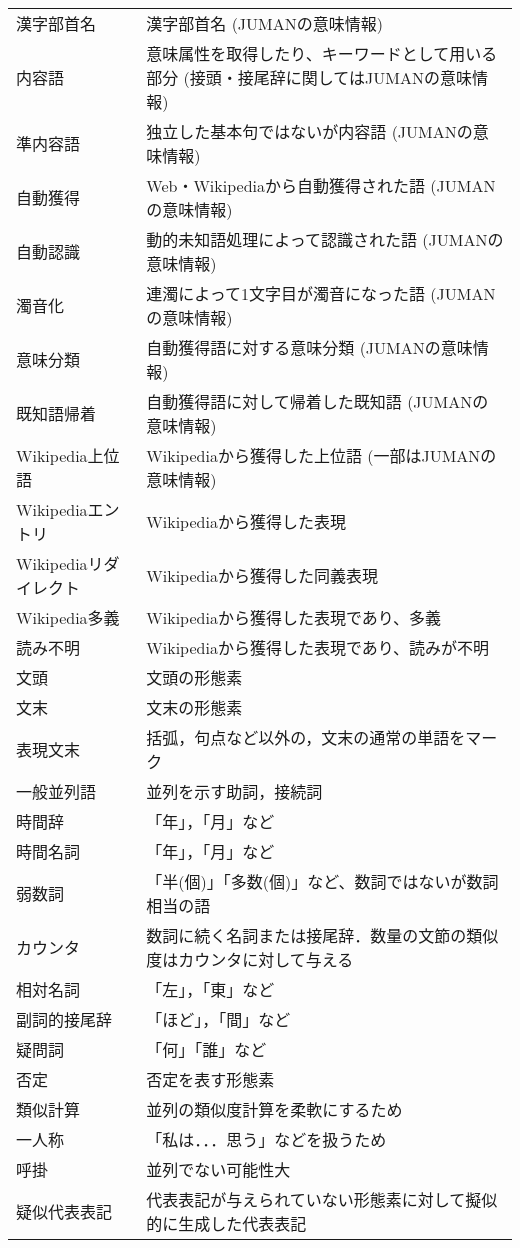 \documentclass[a4j]{jarticle}
\begin{document}
\begin{supertabular}{p{4.2cm}p{9.6cm}}
漢字部首名 & 漢字部首名 (JUMANの意味情報)\\
内容語 & 意味属性を取得したり、キーワードとして用いる部分 (接頭・接尾辞に関してはJUMANの意味情報)\\
準内容語 & 独立した基本句ではないが内容語 (JUMANの意味情報) \\
自動獲得 & Web・Wikipediaから自動獲得された語 (JUMANの意味情報)\\
自動認識 & 動的未知語処理によって認識された語 (JUMANの意味情報)\\
濁音化 & 連濁によって1文字目が濁音になった語 (JUMANの意味情報)\\
意味分類 & 自動獲得語に対する意味分類 (JUMANの意味情報)\\
既知語帰着 & 自動獲得語に対して帰着した既知語 (JUMANの意味情報)\\
Wikipedia上位語 & Wikipediaから獲得した上位語 (一部はJUMANの意味情報)\\
Wikipediaエントリ & Wikipediaから獲得した表現\\
Wikipediaリダイレクト & Wikipediaから獲得した同義表現\\
Wikipedia多義 & Wikipediaから獲得した表現であり、多義\\
読み不明 & Wikipediaから獲得した表現であり、読みが不明\\
文頭 & 文頭の形態素\\
文末 & 文末の形態素\\
表現文末 & 括弧，句点など以外の，文末の通常の単語をマーク\\
一般並列語 & 並列を示す助詞，接続詞\\
時間辞 & 「年」，「月」など\\
時間名詞 & 「年」，「月」など\\
弱数詞 & 「半(個)」「多数(個)」など、数詞ではないが数詞相当の語\\
カウンタ & 数詞に続く名詞または接尾辞．数量の文節の類似度はカウンタに対して与える\\
相対名詞 & 「左」，「東」など\\
副詞的接尾辞 & 「ほど」，「間」など\\
疑問詞 & 「何」「誰」など\\
否定 & 否定を表す形態素\\
類似計算 & 並列の類似度計算を柔軟にするため\\
一人称 & 「私は．．．思う」などを扱うため\\
呼掛 & 並列でない可能性大\\
疑似代表表記 & 代表表記が与えられていない形態素に対して擬似的に生成した代表表記 \\

\end{supertabular}
\end{document}
